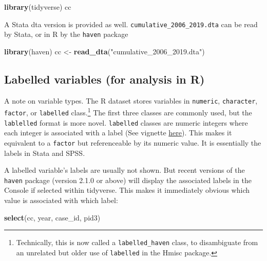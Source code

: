\documentclass[10pt,article,oneside]{memoir}
\theoremstyle{definition}
\newenvironment{Shaded}{\begin{snugshade}}{\end{snugshade}}
\newcommand{\KeywordTok}[1]{\textcolor[rgb]{0.13,0.29,0.53}{\textbf{#1}}}
\newcommand{\NormalTok}[1]{#1}
\newcommand{\StringTok}[1]{\textcolor[rgb]{0.31,0.60,0.02}{#1}}
\begin{document}
\begin{Shaded}
\begin{Highlighting}[]
\KeywordTok{library}\NormalTok{(tidyverse)}
\NormalTok{cc}
\end{Highlighting}
\end{Shaded}

\noindent  A Stata dta version is provided as well.
\texttt{cumulative\_2006\_2019.dta} can be read by Stata, or in R by the
\texttt{haven} package

\begin{Shaded}
\begin{Highlighting}[]
\KeywordTok{library}\NormalTok{(haven)}
\NormalTok{cc <{-}}\StringTok{ }\KeywordTok{read\_dta}\NormalTok{(}\StringTok{"cumulative\_2006\_2019.dta"}\NormalTok{)}
\end{Highlighting}
\end{Shaded}

\hypertarget{labelled-variables-for-analysis-in-r}{%
\subsection{Labelled variables (for analysis in
R)}\label{labelled-variables-for-analysis-in-r}}

A note on variable types. The R dataset stores variables in
\texttt{numeric}, \texttt{character}, \texttt{factor}, or
\texttt{labelled} class.\footnote{Technically, this is now called a
  \texttt{labelled\_haven} class, to disambiguate from an unrelated but
  older use of \texttt{labelled} in the Hmisc package.} The first three
classes are commonly used, but the \texttt{lablelled} format is more
novel. \texttt{labelled} classes are numeric integers where each integer
is associated with a label (See vignette
\href{https://cran.r-project.org/web/packages/labelled/vignettes/intro_labelled.html}{here}).
This makes it equivalent to a \texttt{factor} but referenceable by its
numeric value. It is essentially the labels in Stata and SPSS.

A labelled variable's labels are usually not shown. But recent versions
of the \texttt{haven} package (version 2.1.0 or above) will display the
associated labels in the Console if selected within tidyverse. This
makes it immediately obvious which value is associated with which label:

\begin{Shaded}
\begin{Highlighting}[]
\KeywordTok{select}\NormalTok{(cc, year, case\_id, pid3)}
\end{Highlighting}
\end{Shaded}
\end{document}
